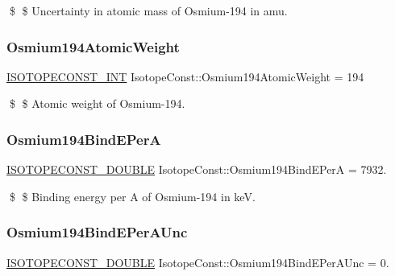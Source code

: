 \$ \$ Uncertainty in atomic mass of Osmium-\/194 in amu. \mbox{\label{group___isotope_const-_osmium-_os194_gaff353a053203cccb6bde19c5f490c385}} 
\subsubsection{\texorpdfstring{Osmium194\+Atomic\+Weight}{Osmium194AtomicWeight}}
{\footnotesize\ttfamily \mbox{\hyperlink{group___isotope_const-_macros_ga5f18360b3e99483a35c32d789e62621c}{I\+S\+O\+T\+O\+P\+E\+C\+O\+N\+S\+T\+\_\+\+I\+NT}} Isotope\+Const\+::\+Osmium194\+Atomic\+Weight = 194}

\$ \$ Atomic weight of Osmium-\/194. \mbox{\label{group___isotope_const-_osmium-_os194_ga03a6566689f3c521b75f734b874587c9}} 
\subsubsection{\texorpdfstring{Osmium194\+Bind\+E\+PerA}{Osmium194BindEPerA}}
{\footnotesize\ttfamily \mbox{\hyperlink{group___isotope_const-_macros_ga8f45a7272ce02c0b4c65c44636ed719a}{I\+S\+O\+T\+O\+P\+E\+C\+O\+N\+S\+T\+\_\+\+D\+O\+U\+B\+LE}} Isotope\+Const\+::\+Osmium194\+Bind\+E\+PerA = 7932.}

\$ \$ Binding energy per A of Osmium-\/194 in keV. \mbox{\label{group___isotope_const-_osmium-_os194_ga8572a4405af611c0f868306ed1b05271}} 
\subsubsection{\texorpdfstring{Osmium194\+Bind\+E\+Per\+A\+Unc}{Osmium194BindEPerAUnc}}
{\footnotesize\ttfamily \mbox{\hyperlink{group___isotope_const-_macros_ga8f45a7272ce02c0b4c65c44636ed719a}{I\+S\+O\+T\+O\+P\+E\+C\+O\+N\+S\+T\+\_\+\+D\+O\+U\+B\+LE}} Isotope\+Const\+::\+Osmium194\+Bind\+E\+Per\+A\+Unc = 0.}

